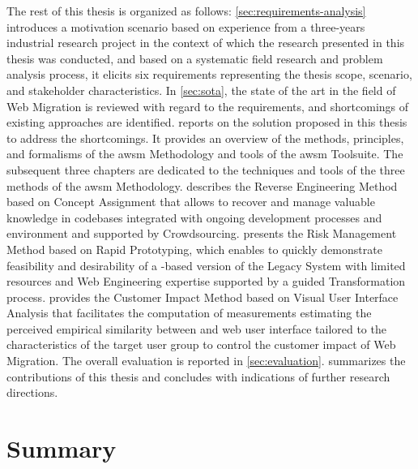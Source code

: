 The rest of this thesis is organized as follows: \cref{sec:requirements-analysis} introduces a motivation scenario based on experience from a three-years industrial research project in the context of which the research presented in this thesis was conducted, and based on a systematic field research and problem analysis process, it elicits six requirements representing the thesis scope, scenario, and stakeholder characteristics.
In \cref{sec:sota}, the state of the art in the field of \gls{Web Migration} is reviewed with regard to the requirements, and shortcomings of existing approaches are identified.
 reports on the solution proposed in this thesis to address the shortcomings.
It provides an overview of the methods, principles, and formalisms of the \gls{awsm} Methodology and tools of the \gls{awsm} Toolsuite.
The subsequent three chapters are dedicated to the techniques and tools of the three methods of the \gls{awsm} Methodology.
 describes the Reverse Engineering Method based on \gls{Concept Assignment} that allows to recover and manage valuable knowledge in  codebases integrated with ongoing development processes and environment and supported by \gls{Crowdsourcing}.
 presents the Risk Management Method based on \gls{Rapid Prototyping}, which enables to quickly demonstrate feasibility and desirability of a -based version of the \gls{Legacy System} with limited resources and \gls{Web Engineering} expertise supported by a guided \gls{Transformation} process.
 provides the Customer Impact Method based on Visual User Interface Analysis that facilitates the computation of measurements estimating the perceived empirical similarity between  and \Gls{web} user interface tailored to the characteristics of the target user group to control the customer impact of \gls{Web Migration}.
The overall evaluation is reported in \cref{sec:evaluation}.
 summarizes the contributions of this thesis and concludes with indications of further research directions.

\vspace{-15pt}
\hypertarget{summary}{%
\section{Summary}\label{summary}}
\vspace{15pt}

